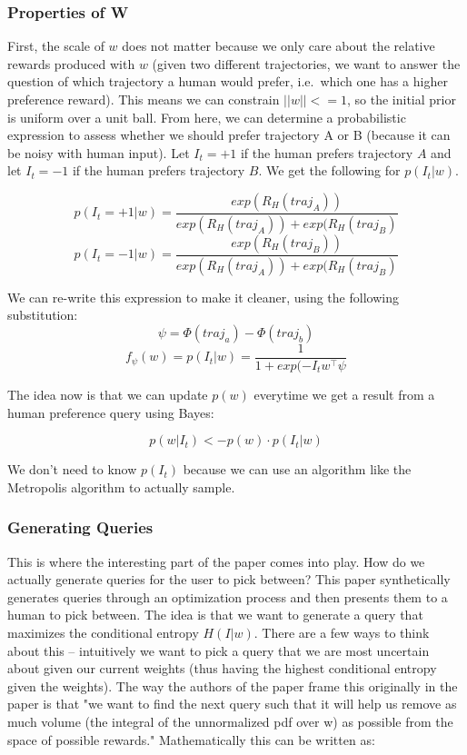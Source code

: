 \documentclass[
  letterpaper,
  numbers=noenddot,
  DIV=11,
  oneside]{scrreprt}
\theoremstyle{remark}
\begin{document}
\subsubsection{Properties of W}\label{properties-of-w}

First, the scale of \(w\) does not matter because we only care about the
relative rewards produced with \(w\) (given two different trajectories,
we want to answer the question of which trajectory a human would prefer,
i.e.~which one has a higher preference reward). This means we can
constrain \(||w|| <= 1\), so the initial prior is uniform over a unit
ball. From here, we can determine a probabilistic expression to assess
whether we should prefer trajectory A or B (because it can be noisy with
human input). Let \(I_t = +1\) if the human prefers trajectory \(A\) and
let \(I_t = -1\) if the human prefers trajectory \(B\). We get the
following for \(p(I_t | w)\).

\[p(I_t = +1|w) = \frac{exp(R_H(traj_A))}{exp(R_H(traj_A)) + exp(R_H(traj_B)}\]
\[p(I_t = -1|w) = \frac{exp(R_H(traj_B))}{exp(R_H(traj_A)) + exp(R_H(traj_B)}\]

We can re-write this expression to make it cleaner, using the following
substitution: \[\psi = \Phi(traj_a) - \Phi(traj_b)\]
\[f_{\psi} (w) = p(I_t|w) = \frac{1}{1 + exp(-I_tw^{\intercal}\psi}\]

The idea now is that we can update \(p(w)\) everytime we get a result
from a human preference query using Bayes:

\[p(w|I_t) <- p(w) \cdot p(I_t|w)\]

We don't need to know \(p(I_t)\) because we can use an algorithm like
the Metropolis algorithm to actually sample.

\subsubsection{Generating Queries}\label{generating-queries}

This is where the interesting part of the paper comes into play. How do
we actually generate queries for the user to pick between? This paper
synthetically generates queries through an optimization process and then
presents them to a human to pick between. The idea is that we want to
generate a query that maximizes the conditional entropy \(H(I|w)\).
There are a few ways to think about this -- intuitively we want to pick
a query that we are most uncertain about given our current weights (thus
having the highest conditional entropy given the weights). The way the
authors of the paper frame this originally in the paper is that "we want
to find the next query such that it will help us remove as much volume
(the integral of the unnormalized pdf over w) as possible from the space
of possible rewards." Mathematically this can be written as:
\end{document}
